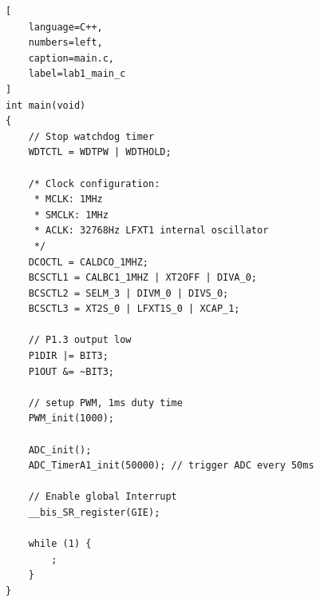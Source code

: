\documentclass{article}
\begin{document}
\begin{lstlisting}[
    language=C++,
    numbers=left,
    caption=main.c,
    label=lab1_main_c
]
int main(void)
{
    // Stop watchdog timer
    WDTCTL = WDTPW | WDTHOLD;

    /* Clock configuration:
     * MCLK: 1MHz
     * SMCLK: 1MHz
     * ACLK: 32768Hz LFXT1 internal oscillator
     */
    DCOCTL = CALDCO_1MHZ;
    BCSCTL1 = CALBC1_1MHZ | XT2OFF | DIVA_0;
    BCSCTL2 = SELM_3 | DIVM_0 | DIVS_0;
    BCSCTL3 = XT2S_0 | LFXT1S_0 | XCAP_1;

    // P1.3 output low
    P1DIR |= BIT3;
    P1OUT &= ~BIT3;

    // setup PWM, 1ms duty time
    PWM_init(1000);

    ADC_init();
    ADC_TimerA1_init(50000); // trigger ADC every 50ms

    // Enable global Interrupt
    __bis_SR_register(GIE);

    while (1) {
        ;
    }
}
\end{lstlisting}
\end{document}
